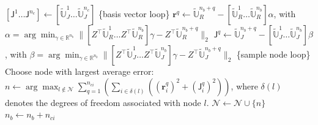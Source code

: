 \documentclass[11pt]{article}
\renewcommand{\vec}[1]{\mathbf{#1}}
\begin{document}
\begin{algorithm}[H]
\begin{algorithmic}[1]
\STATE $[\mathsf{J}^1 \ldots \mathsf{J}^{n_c}] \gets [\widetilde{\mathbb{U}}_J^1 \ldots \widetilde{\mathbb{U}}_J^{n_c}]$
\ELSE
{} \{basis vector loop\}
\STATE $\vec{r}^q \gets \widetilde{\mathbb{U}}_R^{n_b+q} - [\widetilde{\mathbb{U}}_R^1 \ldots \widetilde{\mathbb{U}}_R^{n_b}] \alpha$, with $\alpha = \arg \min_{\gamma \in \mathbb{R}^{n_b}} \| [Z^\top \widetilde{\mathbb{U}}_R^1 \ldots Z^\top \widetilde{\mathbb{U}}_R^{n_b}] \gamma - Z^\top \widetilde{\mathbb{U}}_R^{n_b+q} \|_2$
\STATE $\mathsf{J}^q \gets \widetilde{\mathbb{U}}_J^{n_b+q} - [\widetilde{\mathbb{U}}_J^1 \ldots \widetilde{\mathbb{U}}_J^{n_b}] \beta$, with $\beta = \arg \min_{\gamma \in \mathbb{R}^{n_b}} \| [Z^\top \widetilde{\mathbb{U}}_J^1 \ldots Z^\top \widetilde{\mathbb{U}}_J^{n_b}] \gamma - Z^\top \widetilde{\mathbb{U}}_J^{n_b+q} \|_2$
\ENDFOR
\ENDIF
{} \{sample node loop\}
\STATE Choose node with largest average error: $n \gets \arg \max_{l \notin \mathcal{N}} \sum_{q=1}^{n_{ci}} \left( \sum_{i \in \delta(l)} \left((\vec{r}_i^q)^2 + (\mathsf{J}_i^q)^2\right) \right)$,
\STATE where $\delta(l)$ denotes the degrees of freedom associated with node $l$.
\STATE $\mathcal{N} \gets \mathcal{N} \cup \{n\}$
\ENDFOR
\STATE $n_b \gets n_b + n_{ci}$
\ENDFOR
\end{algorithmic}
\end{algorithm}
\end{document}
